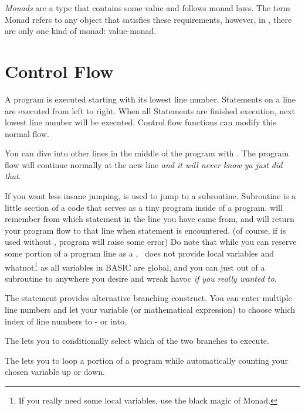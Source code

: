 \emph{Monads} are a type that contains some value and follows monad laws. The term Monad refers to any object that satisfies these requirements, however, in \tbas, there are only one kind of monad: value-monad.

\section{Control Flow}

A program is executed starting with its lowest line number. Statements on a line are executed from left to right. When all Statements are finished execution, next lowest line number will be executed. Control flow functions can modify this normal flow.

You can dive into other lines in the middle of the program with . The program flow will continue normally at the new line \emph{and it will never know ya just did that}.

If you want less insane jumping,  is used to jump to a subroutine. Subroutine is a little section of a code that serves as a tiny program inside of a program.  will remember from which statement in the line you have came from, and will return your program flow to that line when  statement is encountered. (of course, if  is used without , program will raise some error) Do note that while you can reserve some portion of a program line as a , \tbas\ does not provide local variables and whatnot\footnote{If you really need some local variables, use the black magic of Monad.} as all variables in BASIC are global, and you can just  out of a subroutine to anywhere you desire and wreak havoc \emph{if you really wanted to}.

The  statement provides alternative branching construct. You can enter multiple line numbers and let your variable (or mathematical expression) to choose which index of line numbers to - or  into.

The  lets you to conditionally select which of the two branches to execute.

The  lets you to loop a portion of a program while automatically counting your chosen variable up or down.
